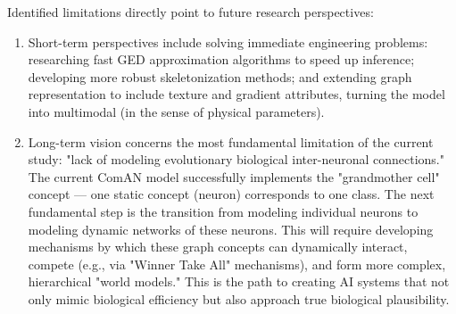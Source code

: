 \documentclass[conference]{IEEEtran}
\begin{document}
Identified limitations directly point to future research perspectives:
\begin{enumerate}
    \item Short-term perspectives include solving immediate engineering problems: researching fast GED approximation algorithms to speed up inference; developing more robust skeletonization methods; and extending graph representation to include texture and gradient attributes, turning the model into multimodal (in the sense of physical parameters).
    \item Long-term vision concerns the most fundamental limitation of the current study: "lack of modeling evolutionary biological inter-neuronal connections." The current ComAN model successfully implements the "grandmother cell" concept — one static concept (neuron) corresponds to one class. The next fundamental step is the transition from modeling individual neurons to modeling dynamic networks of these neurons. This will require developing mechanisms by which these graph concepts can dynamically interact, compete (e.g., via "Winner Take All" mechanisms), and form more complex, hierarchical "world models." This is the path to creating AI systems that not only mimic biological efficiency but also approach true biological plausibility.
\end{enumerate}
\end{document}
